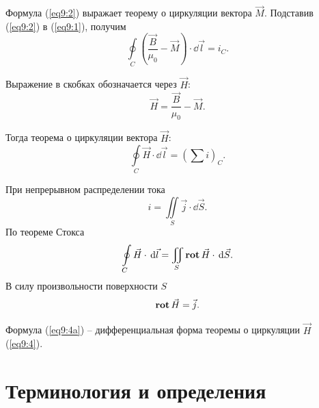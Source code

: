     Формула (\ref{eq9:2}) выражает теорему о циркуляции вектора \( \vec{M} \).
    Подставив (\ref{eq9:2}) в (\ref{eq9:1}), получим
    \[
        \oint\limits_C \left(\frac{\vec{B}}{\mu_0} -
        \vec{M}\right)\cdot\dd\vec{l} = i_C.
    \]
    
    Выражение в скобках обозначается через \( \vec{H} \):
    \begin{equation}
        \vec{H} = \frac{\vec{B}}{\mu_0} - \vec{M}.
        \label{eq9:3}
    \end{equation}
    
    Тогда теорема о циркуляции вектора \( \vec{H} \):
    \begin{equation}
        \oint\limits_C \vec{H}\cdot\dd\vec{l} = \left(\sum i\right)_C.
        \label{eq9:4}
    \end{equation}

    При непрерывном распределении тока
    \[
        i = \iint\limits_S \vec{j}\cdot\dd\vec{S}.
    \]
    По теореме Стокса
    \[
        \oint\limits_C \vec{H}\cdot\,\mathrm{d}\vec{l} =
        \iint\limits_S \mathbf{rot\,}\vec{H}\cdot\,\mathrm{d}\vec{S}.
    \]
    В силу произвольности поверхности \( S \)
    \begin{equation}
        \mathbf{rot\,}\vec{H} = \vec{j}.
        \label{eq9:4a}
    \end{equation}
    
    Формула (\ref{eq9:4a}) -- дифференциальная форма теоремы о циркуляции
    \( \vec{H} \) (\ref{eq9:4}).
    
\section{Терминология и определения}

